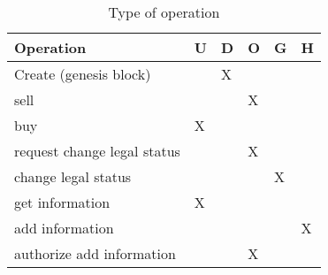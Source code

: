 \begin{table}[htb]
\footnotesize
    \begin{center}
    \caption{Type of operation}
    \label{table:operations}
        \begin{tabular}{l|l|l|l|l|l}
        \textbf{Operation}          &\textbf{U}& \textbf{D}&\textbf{O}& \textbf{G}& \textbf{H}\\ \hline
        Create (genesis block)      &          & X         &          &           &           \\ \hline
        sell                        &          &           & X        &           &           \\ \hline
        buy                         & X        &           &          &           &           \\ \hline
        request change legal status &          &           & X        &           &           \\ \hline
        change legal status         &          &           &          & X         &           \\ \hline
        get information             & X        &           &          &           &           \\ \hline
        add information             &          &           &          &           & X         \\ \hline
        authorize add information   &          &           & X        &           &           \\ \hline
        \end{tabular}
    \end{center}
\end{table}